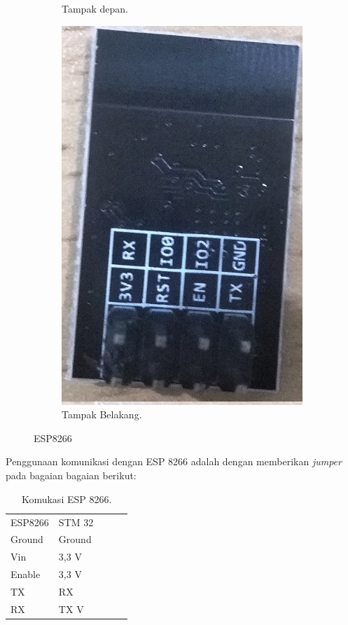 \documentclass[11pt]{article}
\begin{document}
\begin{figure}[h!]
\begin{subfigure}[b]{0.39\linewidth}
		\caption{Tampak depan.}
	\end{subfigure}
	\begin{subfigure}[b]{0.4\linewidth}
		\includegraphics[width=\linewidth]{dokumentasi/ESP8266/wifi1.jpg}
		\caption{Tampak Belakang.}
	\end{subfigure}
	\caption{ESP8266}
	\label{fig:ESP8266}
\end{figure}
Penggunaan komunikasi dengan ESP 8266 adalah dengan memberikan \textit{jumper} pada bagaian bagaian berikut: 
\begin{table}[h!]
	 \caption{Komukasi ESP 8266.}
	\label{tab:Komukasi ESP 8266}
	\begin{tabular}{|l|l|lll}
		\cline{1-2}
		ESP8266 & STM 32 &  &  &  \\ \cline{1-2}
		Ground  & Ground &  &  &  \\ \cline{1-2}
		Vin     & 3,3 V  &  &  &  \\ \cline{1-2}
		Enable  & 3,3 V  &  &  &  \\ \cline{1-2}
		TX  	& RX  	&  &  &  \\ \cline{1-2}
		RX  	& TX V  &  &  &  \\ \cline{1-2}
	\end{tabular}
\end{table}
\end{document}
